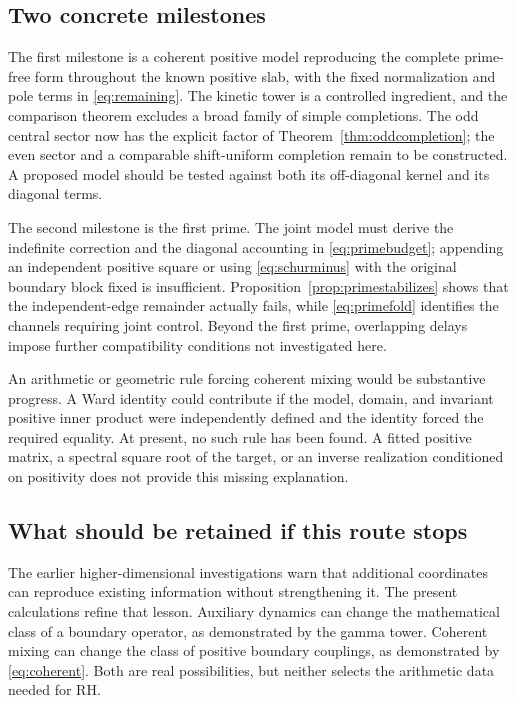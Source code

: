 \documentclass[11pt]{article}
\numberwithin{equation}{section}
\theoremstyle{definition}
\theoremstyle{remark}
\begin{document}
\subsection{Two concrete milestones}

The first milestone is a coherent positive model reproducing the complete
prime-free form throughout the known positive slab, with the fixed
normalization and pole terms in \eqref{eq:remaining}. The kinetic tower is
a controlled ingredient, and the comparison theorem excludes a broad
family of simple completions. The odd central sector now has the explicit
factor of Theorem~\ref{thm:oddcompletion}; the even sector and a comparable
shift-uniform completion remain to be constructed. A proposed model should be tested against
both its off-diagonal kernel and its diagonal terms.

The second milestone is the first prime. The joint model must derive the
indefinite correction and the diagonal accounting in
\eqref{eq:primebudget}; appending an independent positive square or using
\eqref{eq:schurminus} with the original boundary block fixed is
insufficient. Proposition~\ref{prop:primestabilizes} shows that the
independent-edge remainder actually fails, while \eqref{eq:primefold}
identifies the channels requiring joint control. Beyond the first prime,
overlapping delays impose further
compatibility conditions not investigated here.

An arithmetic or geometric rule forcing coherent mixing would be
substantive progress. A Ward identity could contribute if the model,
domain, and invariant positive inner product were independently defined
and the identity forced the required equality. At present, no such rule
has been found. A fitted positive matrix, a spectral square root of the
target, or an inverse realization conditioned on positivity does not
provide this missing explanation.

\subsection{What should be retained if this route stops}

The earlier higher-dimensional investigations warn that additional
coordinates can reproduce existing information without strengthening it.
The present calculations refine that lesson. Auxiliary dynamics can
change the mathematical class of a boundary operator, as demonstrated
by the gamma tower. Coherent mixing can change the class of positive
boundary couplings, as demonstrated by \eqref{eq:coherent}. Both are
real possibilities, but neither selects the arithmetic data needed for RH.
\end{document}
